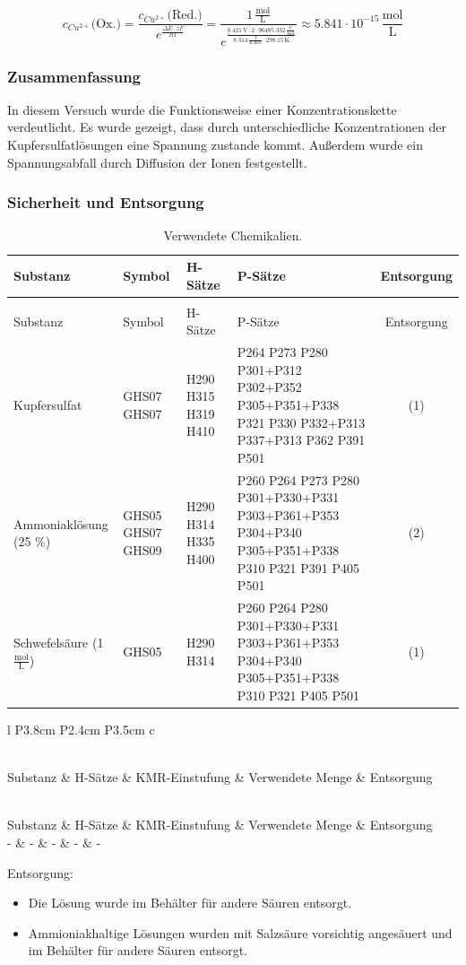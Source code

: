 \documentclass[
	a4paper,										%
	12pt,											%
	twoside,										%
	headsepline,								%
	footsepline,									%
	captions=tableheading,					%
]{scrartcl}
\newcommand{\formel}[2]{				%
	\begin{equation}
		\label{eq: #1}							%
		#2											%
	\end{equation}}
\newcommand{\langetabelle}[6]{  %
	\begin{centering}           %
		{\begin{longtable}[#3]{#4}
				\caption{#2\label{tab: #1}}\\				
				\hline
				#5
				\hline
				\endfirsthead
                \caption{#2\label{tab: #1}}\\
				\hline
				#5
				\hline
				\endhead
				#6												
				\hline 
		\end{longtable}}
\end{centering}}
\begin{document}
\formel{gl3}{c_{Cu^{2+}}\text{(Ox.)} = \frac{c_{Cu^{2+}}\text{(Red.)}}{e^{\frac{\Delta E \cdot zF}{RT}}}=\frac{1\,\frac{\text{mol}}{\text{L}}}{e^{\frac{0.421\,\text{V} \cdot 2 \cdot  96 485.332\,\frac{\text{C}}{\text{mol}}}{8.314\,\frac{\text{J}}{\text{K}\cdot \text{mol}}\cdot 298.15\,\text{K}}}}\approx5.841\cdot 10^{-15}\,\frac{\text{mol}}{\text{L}}}

\subsubsection{Zusammenfassung}


In diesem Versuch wurde die Funktionsweise einer Konzentrationskette verdeutlicht.
Es wurde gezeigt, dass durch unterschiedliche Konzentrationen der Kupfersulfatlösungen eine Spannung zustande kommt. Außerdem wurde ein Spannungsabfall durch Diffusion der Ionen festgestellt.



\subsubsection{Sicherheit und Entsorgung}
		
\langetabelle
	{Chemikalien2}
	{Verwendete Chemikalien.}
	{H}  %
	{l p{1.4cm} p{2.2cm} p{4.5cm} c}
	{Substanz & Symbol & H-Sätze & P-Sätze & Entsorgung \\}
	{ Kupfersulfat & GHS07 GHS07 & H290 H315 H319 H410 & P264 P273 P280 P301+P312 P302+P352 P305+P351+P338 P321 P330 P332+P313 P337+P313
    P362 P391 P501 & (1) \\
    Ammoniaklösung (25 \%) & GHS05 GHS07 GHS09 & H290 H314 H335 H400 & P260 P264 P273 P280 P301+P330+P331 P303+P361+P353 P304+P340 P305+P351+P338
    P310 P321 P391 P405 P501 & (2) \\
    Schwefelsäure (1 $\mathrm{\frac{mol}{L}}$) & GHS05 & H290 H314 & P260 P264 P280 P301+P330+P331 P303+P361+P353 P304+P340 P305+P351+P338 P310
    P321 P405 P501  & (1) \\}

\langetabelle
	{KMR_leer2}
	{Verwendete kanzerogene, mutagene oder reproduktionstoxische Gefahrstoffe (KMR).}
	{H}
	{l P{3.8cm} P{2.4cm} P{3.5cm} c}
	{Substanz & H-Sätze & KMR-Einstufung & Verwendete Menge & Entsorgung \\}
	{ - & - & - & - & - \\}
	
Entsorgung: \\
\begin{itemize}
    \item[(1)] Die Lösung wurde im Behälter für andere Säuren entsorgt.
    \item[(2)] Ammioniakhaltige Lösungen wurden mit Salzsäure vorsichtig angesäuert und im Behälter für andere Säuren entsorgt.
\end{itemize}	
\end{document}
